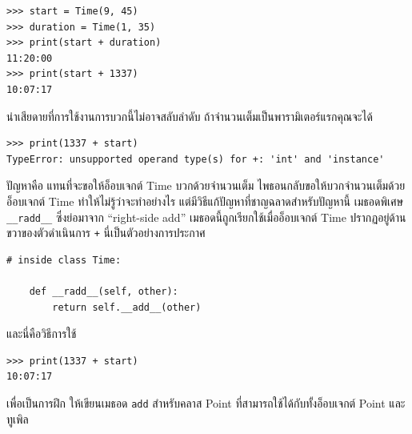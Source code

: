 \begin{verbatim}
>>> start = Time(9, 45)
>>> duration = Time(1, 35)
>>> print(start + duration)
11:20:00
>>> print(start + 1337)
10:07:17
\end{verbatim}
%

น่าเสียดายที่การใช้งานการบวกนี้ไม่อาจสลับลำดับ ถ้าจำนวนเต็มเป็นพารามิเตอร์แรกคุณจะได้

\begin{verbatim}
>>> print(1337 + start)
TypeError: unsupported operand type(s) for +: 'int' and 'instance'
\end{verbatim}
%

ปัญหาคือ แทนที่จะขอให้อ็อบเจกต์ Time บวกด้วยจำนวนเต็ม  ไพธอนกลับขอให้บวกจำนวนเต็มด้วยอ็อบเจกต์ Time ทำให้ไม่รู้ว่าจะทำอย่างไร
แต่มีวิธีแก้ปัญหาที่ชาญฉลาดสำหรับปัญหานี้ เมธอดพิเศษ \verb"__radd__" ซึ่งย่อมาจาก ``right-side add'' 
เมธอดนี้ถูกเรียกใช้เมื่ออ็อบเจกต์ Time ปรากฏอยู่ด้านขวาของตัวดำเนินการ {\tt +} นี่เป็นตัวอย่างการประกาศ

\begin{verbatim}
# inside class Time:

    def __radd__(self, other):
        return self.__add__(other)
\end{verbatim}
%

และนี่คือวิธีการใช้

\begin{verbatim}
>>> print(1337 + start)
10:07:17
\end{verbatim}
%

เพื่อเป็นการฝึก ให้เขียนเมธอด {\tt add} สำหรับคลาส Point ที่สามารถใช้ได้กับทั้งอ็อบเจกต์ Point และทูเพิล

